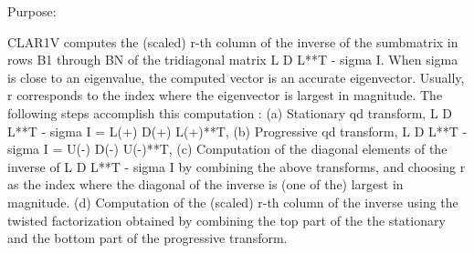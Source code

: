  \begin{DoxyParagraph}{Purpose\+: }
\begin{DoxyVerb} CLAR1V computes the (scaled) r-th column of the inverse of
 the sumbmatrix in rows B1 through BN of the tridiagonal matrix
 L D L**T - sigma I. When sigma is close to an eigenvalue, the
 computed vector is an accurate eigenvector. Usually, r corresponds
 to the index where the eigenvector is largest in magnitude.
 The following steps accomplish this computation :
 (a) Stationary qd transform,  L D L**T - sigma I = L(+) D(+) L(+)**T,
 (b) Progressive qd transform, L D L**T - sigma I = U(-) D(-) U(-)**T,
 (c) Computation of the diagonal elements of the inverse of
     L D L**T - sigma I by combining the above transforms, and choosing
     r as the index where the diagonal of the inverse is (one of the)
     largest in magnitude.
 (d) Computation of the (scaled) r-th column of the inverse using the
     twisted factorization obtained by combining the top part of the
     the stationary and the bottom part of the progressive transform.\end{DoxyVerb}
 
\end{DoxyParagraph}

